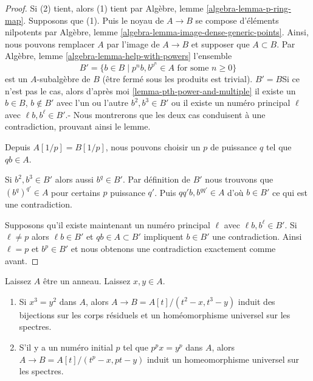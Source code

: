 \begin{proof}

Si (2) tient, alors (1) tient par Algèbre, lemme \ref{algebra-lemma-p-ring-map}. Supposons que (1). Puis le noyau de $A \to B$ se compose d'éléments nilpotents par Algèbre, lemme \ref{algebra-lemma-image-dense-generic-points}. Ainsi, nous pouvons remplacer $A$ par l'image de $A \to B$ et supposer que
$A \subset B$. Par Algèbre, lemme \ref{algebra-lemma-help-with-powers}
l'ensemble
$$
B' = \{b \in B \mid p^nb, b^{p^n} \in A\text{ for some }n \geq 0\}
$$
est un $A$-subalgèbre de $B$ (être fermé sous les produits est trivial). $B' = B$Si ce n'est pas le cas, alors d'après moi \ref{lemma-pth-power-and-multiple}
il existe un $b \in B$, $b \not \in B'$ avec l'un ou l'autre
$b^2, b^3 \in B'$ ou il existe un numéro principal $\ell$
avec $\ell b, b^\ell \in B'$.- Nous montrerons que les deux cas conduisent à une contradiction, prouvant ainsi le lemme.

\medskip\noindent
Depuis $A[1/p] = B[1/p]$, nous pouvons choisir un $p$ de puissance $q$ tel que $qb \in A$.

\medskip\noindent
Si $b^2, b^3 \in B'$ alors aussi $b^q \in B'$. Par définition de $B'$ nous trouvons que $(b^q)^{q'} \in A$ pour certains $p$ puissance $q'$. Puis $qq'b, b^{qq'} \in A$ d'où $b \in B'$ ce qui est une contradiction.

\medskip\noindent
Supposons qu'il existe maintenant un numéro principal $\ell$ avec $\ell b, b^\ell \in B'$. Si $\ell \not = p$ alors $\ell b \in B'$ et $qb \in A \subset B'$ impliquent $b \in B'$ une contradiction. Ainsi $\ell = p$ et $b^p \in B'$ et nous obtenons une contradiction exactement comme avant.
\end{proof}

\begin{lemma}

\label{lemma-make-universal-homeo}
Laissez $A$ être un anneau. Laissez $x, y \in A$.
\begin{enumerate}
\item Si $x^3 = y^2$ dans $A$, alors $A \to B = A[t]/(t^2 - x, t^3 - y)$ induit des bijections sur les corps résiduels et un homéomorphisme universel sur les spectres.
\item S'il y a un numéro initial $p$ tel que $p^px = y^p$ dans $A$, alors $A \to B = A[t]/(t^p - x, pt - y)$ induit un homeomorphisme universel sur les spectres.
\end{enumerate}

\end{lemma}

